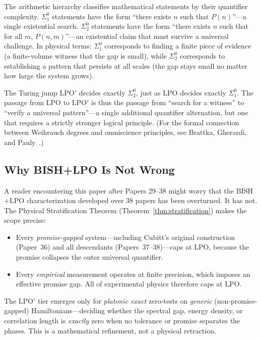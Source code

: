 \documentclass[11pt,a4paper]{article}
\theoremstyle{plain}
\theoremstyle{definition}
\newcommand{\LPO}{\ensuremath{\mathrm{LPO}}}
\newcommand{\LPOj}{\ensuremath{\mathrm{LPO'}}}
\newcommand{\BISH}{\ensuremath{\mathrm{BISH}}}
\begin{document}
The arithmetic hierarchy classifies mathematical statements by their
quantifier complexity.  $\Sigma_1^0$ statements have the form
``there exists $n$ such that $P(n)$''---a single existential search.
$\Sigma_2^0$ statements have the form ``there exists $n$ such that
for all $m$, $P(n,m)$''---an existential claim that must survive a
universal challenge.  In physical terms: $\Sigma_1^0$ corresponds to
finding a finite piece of evidence (a finite-volume witness that the
gap is small), while $\Sigma_2^0$ corresponds to establishing a pattern
that persists at all scales (the gap stays small no matter how large
the system grows).

The Turing jump $\LPOj$ decides exactly $\Sigma_2^0$, just as $\LPO$
decides exactly $\Sigma_1^0$.  The passage from $\LPO$ to $\LPOj$ is
thus the passage from ``search for a witness'' to ``verify a universal
pattern''---a single additional quantifier alternation, but one that
requires a strictly stronger logical principle.  (For the formal
connection between Weihrauch degrees and omniscience principles, see
Brattka, Gherardi, and Pauly~\cite{BrattkaEtAl2012}.)

\subsection{Why BISH+LPO Is Not Wrong}

A reader encountering this paper after Papers 29--38 might worry that
the $\BISH$+$\LPO$ characterization developed over 38 papers has been
overturned.  It has not.  The Physical Stratification Theorem
(Theorem~\ref{thm:stratification}) makes the scope precise:
\begin{itemize}[nosep]
\item Every \emph{promise-gapped} system---including Cubitt's original
  construction (Paper~36) and all descendants (Papers~37--38)---caps
  at $\LPO$, because the promise collapses the outer universal
  quantifier.
\item Every \emph{empirical} measurement operates at finite precision,
  which imposes an effective promise gap.  All of experimental physics
  therefore caps at $\LPO$.
\end{itemize}
The $\LPOj$ tier emerges only for \emph{platonic exact} zero-tests
on \emph{generic} (non-promise-gapped) Hamiltonians---deciding
whether the spectral gap, energy density, or correlation length
is \emph{exactly} zero when no tolerance or promise separates the
phases.  This is a mathematical refinement, not a physical retraction.
\end{document}
